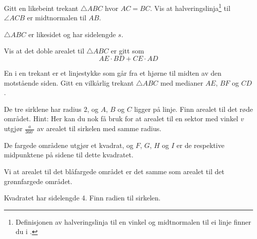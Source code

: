 Gitt en likebeint trekant $\triangle {ABC} $ hvor $ AC=BC $. Vis at halveringslinja\footnote{Definisjonen av halveringslinja til en vinkel og midtnormalen til ei linje finner du i \tmen.} til $ \angle ACB $ er midtnormalen til $ AB $.

$ \triangle ABC $ er likesidet og har sidelengde $ s $. 



\newpage
{}
Vis at det doble arealet til $ \triangle ABC $ er gitt som
\[ AE\cdot BD + CE\cdot AD \]


En  i en trekant er et linjestykke som går fra et hjørne til midten av den motstående siden. 
Gitt en vilkårlig trekant $ \triangle ABC $ med medianer $ AE $, $ BF $ og  $ CD $. 

\newpage
{}
De tre sirklene har radius $ 2 $, og $ A $, $ B $ og $ C $ ligger på linje.
Finn arealet til det røde området.
{\footnotesize Hint: Her kan du nok få bruk for at arealet til en sektor med vinkel $ v $ utgjør $ \frac{a}{360^\circ} $ av arealet til sirkelen med samme radius.}


De fargede områdene utgjør et kvadrat, og $ F $, $ G $, $ H $ og $ I $ er de respektive midpunktene på sidene til dette kvadratet.\os

Vi at arealet til det blåfargede området er det samme som arealet til det grønnfargede området.

Kvadratet har sidelengde 4. Finn radien til sirkelen.

